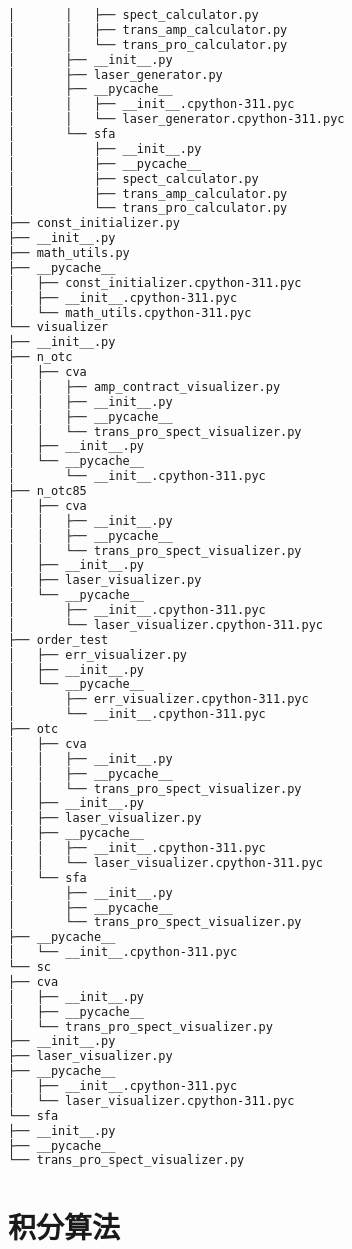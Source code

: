 \begin{lstlisting}[language=bash, caption={files tree}, label={code:tree_script},
	    extendedchars=true,  % 允许扩展字符集
		inputencoding=utf8x,  % 显式声明UTF-8输入
	]
│       │   ├── spect_calculator.py
│       │   ├── trans_amp_calculator.py
│       │   └── trans_pro_calculator.py
│       ├── __init__.py
│       ├── laser_generator.py
│       ├── __pycache__
│       │   ├── __init__.cpython-311.pyc
│       │   └── laser_generator.cpython-311.pyc
│       └── sfa
│           ├── __init__.py
│           ├── __pycache__
│           ├── spect_calculator.py
│           ├── trans_amp_calculator.py
│           └── trans_pro_calculator.py
├── const_initializer.py
├── __init__.py
├── math_utils.py
├── __pycache__
│   ├── const_initializer.cpython-311.pyc
│   ├── __init__.cpython-311.pyc
│   └── math_utils.cpython-311.pyc
└── visualizer
├── __init__.py
├── n_otc
│   ├── cva
│   │   ├── amp_contract_visualizer.py
│   │   ├── __init__.py
│   │   ├── __pycache__
│   │   └── trans_pro_spect_visualizer.py
│   ├── __init__.py
│   └── __pycache__
│       └── __init__.cpython-311.pyc
├── n_otc85
│   ├── cva
│   │   ├── __init__.py
│   │   ├── __pycache__
│   │   └── trans_pro_spect_visualizer.py
│   ├── __init__.py
│   ├── laser_visualizer.py
│   └── __pycache__
│       ├── __init__.cpython-311.pyc
│       └── laser_visualizer.cpython-311.pyc
├── order_test
│   ├── err_visualizer.py
│   ├── __init__.py
│   └── __pycache__
│       ├── err_visualizer.cpython-311.pyc
│       └── __init__.cpython-311.pyc
├── otc
│   ├── cva
│   │   ├── __init__.py
│   │   ├── __pycache__
│   │   └── trans_pro_spect_visualizer.py
│   ├── __init__.py
│   ├── laser_visualizer.py
│   ├── __pycache__
│   │   ├── __init__.cpython-311.pyc
│   │   └── laser_visualizer.cpython-311.pyc
│   └── sfa
│       ├── __init__.py
│       ├── __pycache__
│       └── trans_pro_spect_visualizer.py
├── __pycache__
│   └── __init__.cpython-311.pyc
└── sc
├── cva
│   ├── __init__.py
│   ├── __pycache__
│   └── trans_pro_spect_visualizer.py
├── __init__.py
├── laser_visualizer.py
├── __pycache__
│   ├── __init__.cpython-311.pyc
│   └── laser_visualizer.cpython-311.pyc
└── sfa
├── __init__.py
├── __pycache__
└── trans_pro_spect_visualizer.py
\end{lstlisting}


\chapter{积分算法}

